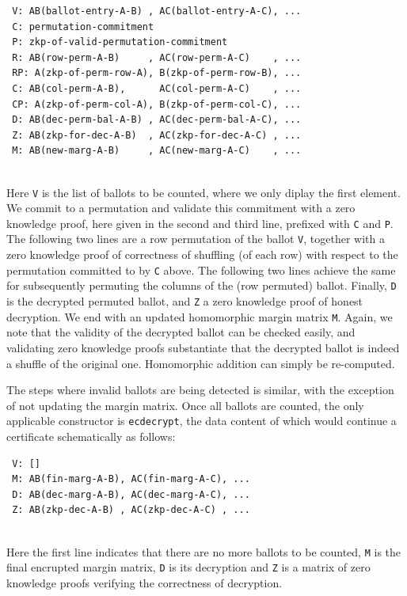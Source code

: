 \documentclass{llncs}
\begin{document}
 {\small\begin{verbatim}
 V: AB(ballot-entry-A-B) , AC(ballot-entry-A-C), ...
 C: permutation-commitment
 P: zkp-of-valid-permutation-commitment
 R: AB(row-perm-A-B)     , AC(row-perm-A-C)    , ...
 RP: A(zkp-of-perm-row-A), B(zkp-of-perm-row-B), ... 
 C: AB(col-perm-A-B),      AC(col-perm-A-C)    , ...
 CP: A(zkp-of-perm-col-A), B(zkp-of-perm-col-C), ...
 D: AB(dec-perm-bal-A-B) , AC(dec-perm-bal-A-C), ...
 Z: AB(zkp-for-dec-A-B)  , AC(zkp-for-dec-A-C) , ...
 M: AB(new-marg-A-B)     , AC(new-marg-A-C)    , ...
 \end{verbatim}}

 \mbox{}\\[-5ex]
 Here \texttt{V} is the list of ballots to be counted, where we only
 diplay the first element. We
 commit to a permutation and validate this commitment with a zero
 knowledge proof, here given in the second and third line, prefixed
 with \texttt{C} and \texttt{P}. The following two lines are a row
 permutation of the ballot \texttt{V}, together with a zero
 knowledge proof of correctness of shuffling (of each row) with
 respect to the permutation committed to by \texttt{C} above. The
 following two lines achieve the same for subsequently permuting the
 columns of the (row permuted) ballot. Finally, \texttt{D} is the
 decrypted permuted ballot, and \texttt{Z} a zero knowledge proof of
 honest decryption. We end with an updated homomorphic margin
 matrix \texttt{M}. Again, we note that the validity of the
 decrypted ballot can be checked easily, and validating zero
 knowledge proofs substantiate that the decrypted ballot is indeed a
 shuffle of the original one. Homomorphic addition can simply be
 re-computed.

 The steps where invalid ballots are being detected is similar, with
 the exception of not updating the margin matrix. Once all ballots
 are counted, the only applicable constructor is \texttt{ecdecrypt},
 the data content of which would continue a certificate
 schematically as follows:

 {\small\begin{verbatim}
 V: []
 M: AB(fin-marg-A-B), AC(fin-marg-A-C), ...
 D: AB(dec-marg-A-B), AC(dec-marg-A-C), ...
 Z: AB(zkp-dec-A-B) , AC(zkp-dec-A-C) , ...
 \end{verbatim}}

 \mbox{}\\[-5ex]
 Here the first line indicates that there are no more ballots to be
 counted, \texttt{M} is the final encrupted margin matrix,
 \texttt{D} is its decryption and \texttt{Z} is a matrix of zero
 knowledge proofs verifying the correctness of decryption.
\end{document}
